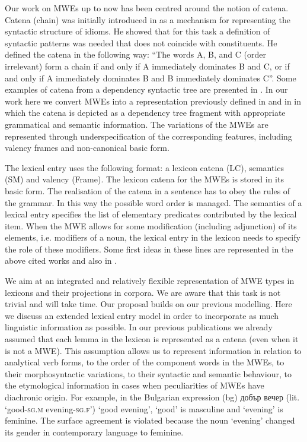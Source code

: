 \documentclass[output=paper,colorlinks,citecolor=brown]{langscibook}
\begin{document}
Our work on MWEs up to now has been centred around the notion of catena. Catena (chain) was initially introduced in \citet{OGrady} as a mechanism for representing the syntactic structure of idioms. He showed that for this task a definition of syntactic patterns was needed that does not coincide with constituents. He defined the catena in the following way: ``The words A, B, and C (order irrelevant) form a chain if and only if A immediately dominates B and C, or if and only if A immediately dominates B and B immediately dominates C''. Some examples of catena from a dependency syntactic tree are presented in .
In our work here we convert MWEs into a representation previously defined in \citet{SimovOsenova2014} and in \citet{simov-osenova-2015-catenaKorea} in which the catena is depicted as a dependency tree fragment with appropriate grammatical and semantic information. The variations of the MWEs are represented through underspecification of the corresponding features, including valency frames and non-canonical basic form. 

The lexical entry uses the following format: a lexicon catena (LC), semantics (SM) and valency (Frame). The lexicon catena for the MWEs is stored in its basic form. The realisation of the catena in a sentence has to obey the rules of the grammar. In this way the possible word order is managed. The semantics of a lexical entry specifies the list of elementary predicates contributed by the lexical item. When the MWE allows for some modification (including adjunction) of its elements, i.e. modifiers of a noun, the lexical entry in the lexicon needs to specify the role of these modifiers. Some first ideas in these lines are represented in the above cited works and also in \citet{laskova-etal-2019-modeling}.

We aim at an integrated and relatively flexible representation of MWE types in lexicons and their projections in corpora. We are aware that this task is not trivial and will take time. Our proposal builds on our previous modelling. Here we discuss an extended lexical entry model in order to incorporate as much linguistic information as possible. In our previous publications we already assumed that each lemma in the lexicon is represented as a catena (even when it is not a MWE). This assumption allows us to represent information in relation to analytical verb forms, to the order of the component words in the MWEs, to their morphosyntactic variations, to their syntactic and semantic behaviour, to the etymological information in cases when peculiarities of MWEs have diachronic origin. For example, in the Bulgarian expression 
(bg) {добър вечер } (lit. `good-\textsc{sg.m} evening-\textsc{sg.f}') {`good evening'},
`good' is masculine and `evening' is feminine. The surface agreement is violated because the noun `evening' changed its gender in contemporary language to feminine. 
\end{document}
